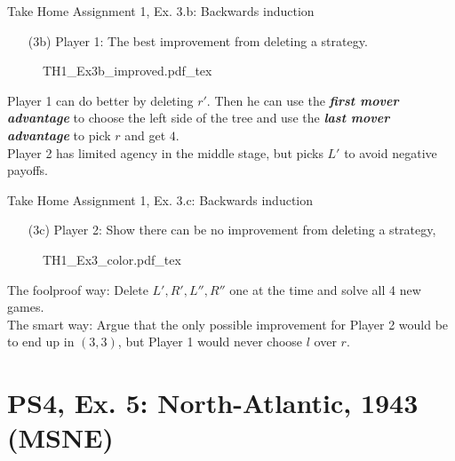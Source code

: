 \begin{frame}{Take Home Assignment 1, Ex. 3.b: Backwards induction}
  \begin{itemize}
    \item[(3b)] Player 1: The best improvement from deleting a strategy.
  \end{itemize}
  \begin{figure}[!h]
    \begin{center}
    \def\svgwidth{\columnwidth}
    {TH1_Ex3b_improved.pdf_tex}
    \end{center}
  \end{figure}
  Player 1 can do better by deleting $r'$. Then he can use the \textit{\textbf{first mover advantage}} to choose the left side of the tree and use the \textit{\textbf{last mover advantage}} to pick $r$ and get $4$.\\\medskip
  Player 2 has limited agency in the middle stage, but picks $L'$ to avoid negative payoffs.
\end{frame}
\begin{frame}{Take Home Assignment 1, Ex. 3.c: Backwards induction}
  \begin{itemize}
    \item[(3c)] Player 2: Show there can be no improvement from deleting a strategy,
  \end{itemize}
  \begin{figure}[!h]
    \begin{center}
    \def\svgwidth{\columnwidth}
    {TH1_Ex3_color.pdf_tex}
    \end{center}
  \end{figure}
  The foolproof way: Delete $L',R',L'',R''$ one at the time and solve all 4 new games.\\\medskip
  The smart way: Argue that the only possible improvement for Player 2 would be to end up in $(3,3)$, but Player 1 would never choose $l$ over $r$.
\end{frame}


\section{PS4, Ex. 5: North-Atlantic, 1943 (MSNE)}

